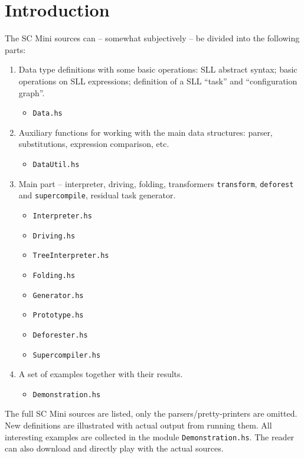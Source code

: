 \section*{Introduction}

The SC Mini sources can -- somewhat subjectively -- be divided into the following parts:
\begin{enumerate}
  \item Data type definitions with some basic operations: SLL abstract syntax;
  basic operations on SLL expressions; definition of a SLL ``task''
  and ``configuration graph''.
  	\begin{itemize}
  	\item \texttt{Data.hs}
  	\end{itemize}
  \item Auxiliary functions for working with the main data structures: parser, substitutions, expression comparison, etc.
  	\begin{itemize}
  	\item \texttt{DataUtil.hs}
  	\end{itemize}
  \item Main part -- interpreter, driving, folding, transformers \texttt{transform},
  \texttt{deforest} and \texttt{supercompile}, residual task generator.
  	\begin{itemize}
  	 \item \texttt{Interpreter.hs}
  	 \item \texttt{Driving.hs}
  	 \item \texttt{TreeInterpreter.hs}
  	 \item \texttt{Folding.hs}
  	 \item \texttt{Generator.hs}
  	 \item \texttt{Prototype.hs}
  	 \item \texttt{Deforester.hs}
  	 \item \texttt{Supercompiler.hs}
  	\end{itemize}
  \item A set of examples together with their results.
  	\begin{itemize}
  	\item \texttt{Demonstration.hs}
  	\end{itemize}
\end{enumerate}

The full SC Mini sources are listed, only the parsers/pretty-printers are omitted.
New definitions are illustrated with actual output from running them.
All interesting examples are collected in the module \texttt{Demonstration.hs}. 
The reader can also download and directly play with the actual sources.

